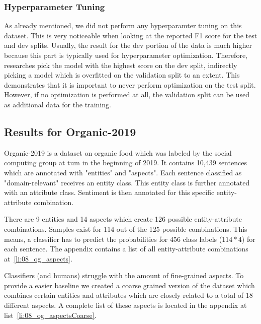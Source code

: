 \subsubsection*{Hyperparameter Tuning}
\label{sec:06_hpTuningAmazon}
As already mentioned, we did not perform any hyperparamter tuning on this dataset. This is very noticeable when looking at the reported F1 score for the test and dev splits. Usually, the result for the dev portion of the data is much higher because this part is typically used for hyperparameter optimization. Therefore, researches pick the model with the highest score on the dev split, indirectly picking a model which is overfitted on the validation split to an extent. This demonstrates that it is important to never perform optimization on the test split. However, if no optimization is performed at all, the validation split can be used as additional data for the training.  



\subsection{Results for Organic-2019}
\label{sec:06_ResultsOrganic}

Organic-2019 is a dataset on organic food which was labeled by the social computing group at \gls{tum} in the beginning of 2019. It contains 10,439 sentences which are annotated with "entities" and "aspects". Each sentence classified as "domain-relevant" receives an entity class. This entity class is further annotated with an attribute class. Sentiment is then annotated for this specific entity-attribute combination.
\medskip

There are 9 entities and 14 aspects which create 126 possible entity-attribute combinations. Samples exist for 114 out of the 125 possible combinations. This means, a classifier has to predict the probabilities for 456 class labels {($114*4$)} for each sentence. The appendix contains a list of all entity-attribute combinations at~\ref{li:08_og_aspects}.
\medskip

Classifiers {(and humans)} struggle with the amount of fine-grained aspects. To provide a easier baseline we created a coarse grained version of the dataset which combines certain entities and attributes which are closely related to a total of 18 different aspects. A complete list of these aspects is located in the appendix at list~\ref{li:08_og_aspectsCoarse}.
\medskip

